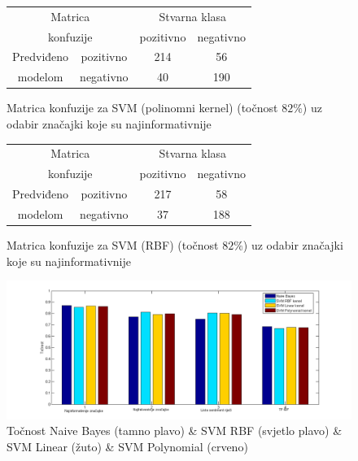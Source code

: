\documentclass[conference]{IEEEtran}
\begin{document}
\begin{figure}[!ht]
\begin{minipage}{0.5\textwidth}
\centering
\begin{tabular}{|c|c|c|c|}
  \hline
  \multicolumn{2}{|c|}{Matrica}  & \multicolumn{2}{|c|}{Stvarna klasa} \\ 
  \cline{3-4}
  \multicolumn{2}{|c|}{konfuzije} & pozitivno & negativno \\ 
  \hline
  Predviđeno & pozitivno & 214 & 56 \\
  \cline{2-4}
  modelom & negativno & 40 & 190 \\
  \hline
\end{tabular}
\caption{Matrica konfuzije za SVM (polinomni kernel) (točnost $82\%$) uz odabir značajki koje su najinformativnije}
\end{minipage}
\end{figure}

\begin{figure}[!ht]
\begin{minipage}{0.5\textwidth}
\centering
\begin{tabular}{|c|c|c|c|}
  \hline
  \multicolumn{2}{|c|}{Matrica}  & \multicolumn{2}{|c|}{Stvarna klasa} \\ 
  \cline{3-4}
  \multicolumn{2}{|c|}{konfuzije} & pozitivno & negativno \\ 
  \hline
  Predviđeno & pozitivno & 217 & 58 \\
  \cline{2-4}
  modelom & negativno & 37 & 188 \\
  \hline
\end{tabular}
\caption{Matrica konfuzije za SVM (RBF) (točnost $82\%$) uz odabir značajki koje su najinformativnije}
\end{minipage}
\end{figure}

\begin{figure}[!ht]
\begin{minipage}{0.5\textwidth}
\centering
\includegraphics[width=\textwidth]{images/SVM_tocnost.png}
\caption{Točnost Naive Bayes (tamno plavo) \& SVM RBF (svjetlo plavo) \& SVM Linear (žuto) \& SVM Polynomial (crveno)}
\end{minipage}
\end{figure}
\end{document}
